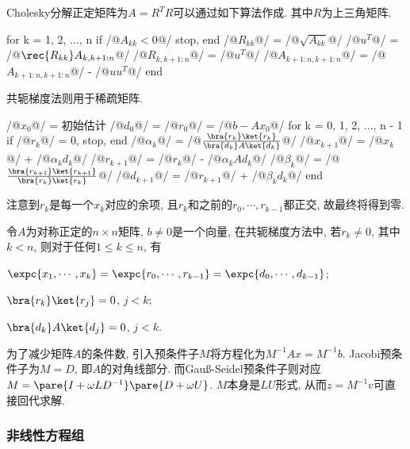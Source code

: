 \documentclass{ctexart}
\begin{document}
Cholesky分解正定矩阵为$A=R^TR$可以通过如下算法作成. 其中$R$为上三角矩阵.
\begin{matlablst}
for k = 1, 2, ..., n
    if /@$A_{kk}<0$@/ stop, end
    /@$R_{kk}$@/ = /@$\sqrt{A_{kk}}$@/
    /@$u^T$@/ = /@$\rec{R_{kk}}A_{k,k+1:n}$@/
    /@$R_{k,k+1:n}$@/ = /@$u^T$@/
    /@$A_{k+1:n,k+1:n}$@/ = /@$A_{k+1:n,k+1:n}$@/ - /@$uu^T$@/
end
\end{matlablst}
共轭梯度法则用于稀疏矩阵.
\begin{matlablst}
/@$x_0$@/ = 初始估计
/@$d_0$@/ = /@$r_0$@/ = /@$b-Ax_0$@/
for k = 0, 1, 2, ..., n - 1
    if /@$r_k$@/ = 0, stop, end
    /@$\alpha_k$@/ = /@$\frac{\bra{r_k}\ket{r_k}}{\bra{d_k}A\ket{d_k}}$@/
    /@$x_{k+1}$@/ = /@$x_k$@/ + /@$\alpha_kd_k$@/
    /@$r_{k+1}$@/ = /@$r_k$@/ - /@$\alpha_kAd_k$@/
    /@$\beta_k$@/ = /@$\frac{\bra{r_{k+1}}\ket{r_{k+1}}}{\bra{r_k}\ket{r_k}}$@/
    /@$d_{k+1}$@/ = /@$r_{k+1}$@/ + /@$\beta_k d_k$@/
end
\end{matlablst}
注意到$r_k$是每一个$x_k$对应的余项, 且$r_k$和之前的$r_0,\cdots,r_{k-1}$都正交, 故最终将得到零.

\begin{theorem}
    令$A$为对称正定的$n\times n$矩阵, $b\neq 0$是一个向量, 在共轭梯度方法中, 若$r_k\neq 0$, 其中$k<n$, 则对于任何$1\le k\le n$, 有
    \begin{cenum}
        \item $\expc{x_1,\cdots,x_k} = \expc{r_0,\cdots,r_{k-1}} = \expc{d_0,\cdots,d_{k-1}}$;
        \item $\bra{r_k}\ket{r_j} = 0$, $j < k$;
        \item $\bra{d_k}A\ket{d_j} = 0$, $j < k$.
    \end{cenum}
\end{theorem}

\par
为了减少矩阵$A$的条件数, 引入预条件子$M$将方程化为$M^{-1}Ax = M^{-1}b$. Jacobi预条件子为$M=D$, 即$A$的对角线部分. 而Gau\ss-Seidel预条件子则对应$M = \pare{I+\omega LD^{-1}}\pare{D+\omega U}$. $M$本身是$LU$形式, 从而$z=M^{-1}v$可直接回代求解.


\subsubsection{非线性方程组} %
\label{ssub:非线性方程组}
\end{document}
